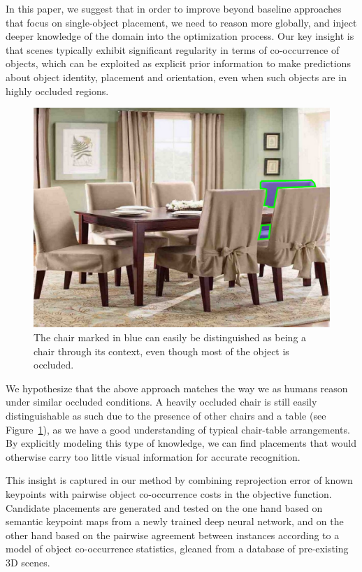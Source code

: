 \documentclass[10pt,twocolumn,letterpaper]{article}
\begin{document}
In this paper, we suggest that in order to improve beyond baseline approaches that focus on single-object placement, we need
to reason more globally, and inject deeper knowledge of
the domain into the optimization process. Our key insight is that scenes
typically exhibit significant regularity in terms of co-occurrence of objects,
which can be exploited as explicit prior information to make predictions about
object identity, placement and orientation, even when such objects are in
highly occluded regions.

\begin{figure}
    \includegraphics[width=\linewidth]{figures/occlusion_example/occlusion_example}
    \caption[Context example]{The chair marked in blue can easily be distinguished as being a chair through its context,
             even though most of the object is occluded.}
    \label{fig:ch4:occlusion_example}
\end{figure}

We hypothesize that the above approach matches the way we as humans
reason under similar occluded conditions. A heavily occluded chair is still easily
distinguishable as such due to the presence of other chairs and a table (see
Figure~\ref{fig:ch4:occlusion_example}), as we have a good understanding of
typical chair-table arrangements. By explicitly modeling this type of
knowledge, we can find placements that would otherwise carry too little visual
information for accurate recognition.

This insight is captured in our method by combining reprojection error of known
keypoints with pairwise object co-occurrence costs in the objective function.
Candidate placements are generated and tested on the one hand based on semantic
keypoint maps from a newly trained deep neural network, and on the other hand
based on the pairwise agreement between instances according to a model of
object co-occurrence statistics, gleaned from a database of pre-existing 3D scenes.
\end{document}
